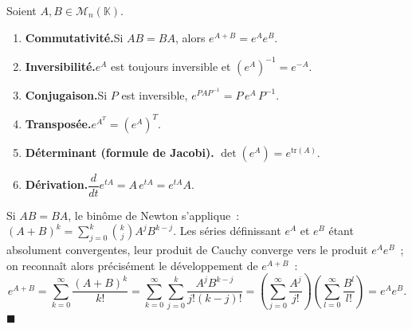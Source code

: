 \decsep{}


\begin{tcolorbox}[thmbox]
  Soient $A, B \in \mathcal{M}_n(\mathbb{K})$.
  \begin{enumerate}
    \item \textbf{Commutativité.}\enspace{}Si $AB = BA$, alors $e^{A+B} = e^A e^B$.
    \item \textbf{Inversibilité.}\enspace{}$e^A$ est toujours inversible et
          ${(e^A)}^{-1} = e^{-A}$.
    \item \textbf{Conjugaison.}\enspace{}Si $P$ est inversible,
          $e^{PAP^{-1}} = P\,e^A\,P^{-1}$.
    \item \textbf{Transposée.}\enspace{}$e^{A^T} = {(e^A)}^T$.
    \item \textbf{Déterminant (formule de Jacobi).}\enspace%
          $\det(e^A) = e^{\mathrm{tr}(A)}$.
    \item \textbf{Dérivation.}\enspace{}$\dfrac{d}{dt}e^{tA} = A\,e^{tA} = e^{tA}A$.
  \end{enumerate}
\end{tcolorbox}


\begin{mdframed}[style=proofbar]
  Si $AB=BA$, le binôme de Newton s'applique~: ${(A+B)}^k = \sum_{j=0}^k \binom{k}{j}A^j B^{k-j}$.
  Les séries définissant $e^A$ et $e^B$ étant absolument convergentes, leur
  produit de Cauchy converge vers le produit $e^A e^B$~; on reconnaît alors
  précisément le développement de $e^{A+B}$~:
  \[
    e^{A+B} = \sum_{k=0}^\infty \frac{{(A+B)}^k}{k!}
    = \sum_{k=0}^\infty \sum_{j=0}^k \frac{A^j B^{k-j}}{j!(k-j)!}
    = \left(\sum_{j=0}^\infty\frac{A^j}{j!}\right)\!\left(\sum_{l=0}^\infty\frac{B^l}{l!}\right)
    = e^A e^B.
  \]
  $\blacksquare$
\end{mdframed}


